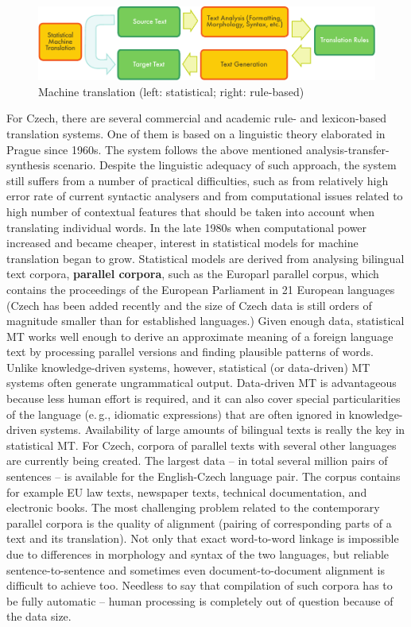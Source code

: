 \documentclass[]{../../metanetpaper}
\begin{document}
\begin{multicols}{2}
\begin{figure}[htb]
  \center
  \includegraphics[width=\textwidth]{../_media/english/machine_translation}
  \caption{Machine translation (left: statistical; right: rule-based)}
  \label{fig:mtarch_en}
\end{figure}

For Czech, there are several commercial and academic rule- and lexicon-based translation systems. One of them is based on a linguistic theory elaborated in Prague since 1960s. The system follows the above mentioned analysis-transfer-synthesis scenario. Despite the linguistic adequacy of such approach, the system still suffers from a number of practical difficulties, such as from relatively high error rate of current syntactic analysers and from computational issues related to high number of contextual features that should be taken into account when translating individual words.
In the late 1980s when computational power increased and became cheaper, interest in statistical models for machine translation began to grow. Statistical models are derived from analysing bilingual text corpora, \textbf{parallel corpora}, such as the Europarl parallel corpus, which contains the proceedings of the European Parliament in 21 European languages (Czech has been added recently and the size of Czech data is still orders of magnitude smaller than for established languages.) Given enough data, statistical MT works well enough to derive an approximate meaning of a foreign language text by processing parallel versions and finding plausible patterns of words. Unlike knowledge-driven systems, however, statistical (or data-driven) MT systems often generate ungrammatical output. Data-driven MT is advantageous because less human effort is required, and it can also cover special particularities of the language (e.\,g., idiomatic expressions) that are often ignored in knowledge-driven systems. 
Availability of large amounts of bilingual texts is really the key in statistical MT. For Czech, corpora of parallel texts with several other languages are currently being created. The largest data – in total several million pairs of sentences – is available for the English-Czech language pair\cite{Note20}. The corpus contains for example EU law texts, newspaper texts, technical documentation, and electronic books. The most challenging problem related to the contemporary parallel corpora is the quality of alignment (pairing of corresponding parts of a text and its translation). Not only that exact word-to-word linkage is impossible due to differences in morphology and syntax of the two languages, but reliable sentence-to-sentence and sometimes even document-to-document alignment is difficult to achieve too. Needless to say that compilation of such corpora has to be fully automatic – human processing is completely out of question because of the data size.


\end{multicols}
\end{document}
